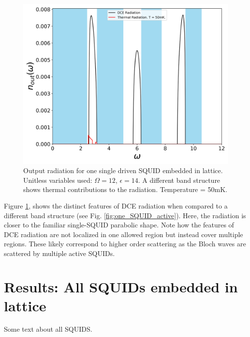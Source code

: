 \begin{figure}[h]
    \centering
    \includegraphics[width=\textwidth, keepaspectratio]{figures/results/one_SQUID_active_epsilon_14.png}
    \caption{Output radiation for one single driven SQUID embedded in lattice. Unitless variables used: $\Omega=12$, $\epsilon=14$. A different band structure shows thermal contributions to the radiation. Temperature = 50mK.}
    \label{fig:one_SQUID_active_e_14_T_50}
\end{figure}
%

\newpage

Figure \ref{fig:one_SQUID_active_e_14_T_50}, shows the distinct features of DCE radiation when compared to a different band structure (see Fig. \ref{fig:one_SQUID_active}). Here, the radiation is closer to the familiar single-SQUID parabolic shape. Note how the features of DCE radiation are not localized in one allowed region but instead cover multiple regions. These likely correspond to higher order scattering as the Bloch waves are scattered by multiple active SQUIDs.

\newpage
\section{Results: All SQUIDs embedded in lattice}\label{sec:results_all_active}

Some text about all SQUIDS.

